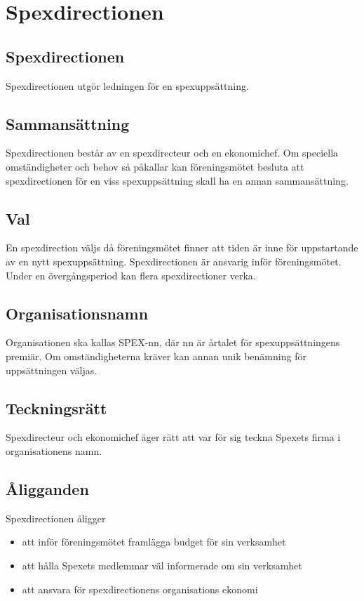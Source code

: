 \documentclass[a4paper]{article}
\begin{document}
\section{Spexdirectionen}
\label{section:spexdirectionen}

\subsection{Spexdirectionen}
Spexdirectionen utgör ledningen för en spexuppsättning.

\subsection{Sammansättning}
Spexdirectionen består av en spexdirecteur och en ekonomichef.\newline
\newline
Om speciella omständigheter och behov så påkallar kan föreningsmötet besluta att spexdirectionen för en viss spexuppsättning skall ha en annan sammansättning.

\subsection{Val}
En spexdirection väljs då föreningsmötet finner att tiden är inne för uppstartande av en nytt spexuppsättning. Spexdirectionen är ansvarig inför föreningsmötet. Under en övergångsperiod kan flera spexdirectioner verka.

\subsection{Organisationsnamn}
Organisationen ska kallas SPEX-nn, där nn är årtalet för spexuppsättningens premiär. Om omständigheterna kräver kan annan unik benämning för uppsättningen väljas.

\subsection{Teckningsrätt}
Spexdirecteur och ekonomichef äger rätt att var för sig teckna Spexets firma i organisationens namn.

\subsection{Åligganden}
Spexdirectionen åligger

\begin{itemize}
  \item att inför föreningsmötet framlägga budget för sin verksamhet
  \item att hålla Spexets medlemmar väl informerade om sin verksamhet
  \item att ansvara för spexdirectionens organisations ekonomi
\end{itemize}
\end{document}

